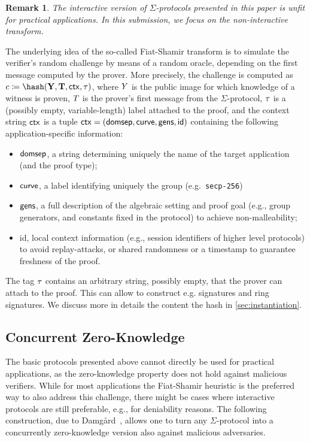 \documentclass[runningheads,11pt]{article}
\newtheorem{remark}{Remark}
\begin{document}
\begin{remark}
The interactive version of $\Sigma$-protocols presented in this paper is unfit for practical applications.
 In this submission, we focus on the non-interactive transform.
\end{remark}


The underlying idea of the so-called Fiat-Shamir transform is to simulate the verifier's random challenge by means of a random oracle, depending on the first message computed by the prover.
More precisely, the challenge is computed as
$c\defeq\hash(\vec \statement,\vec \commitment, \ctx, \stag)$,
where $Y$ is the public image for which knowledge of a witness is proven, $T$ is the prover's first message from the $\Sigma$-protocol, $\tau$ is a (possibly empty, variable-length) label attached to the proof, and
the context string $\mathsf{ctx}$ is a tuple $\mathsf{ctx} = (\textsf{domsep}, \textsf{curve}, \textsf{gens}, \textsf{id})$ containing the following application-specific information:
\begin{itemize}
  \item $\textsf{domsep}$, a string determining uniquely the name of the target application (and the proof type);
  \item $\textsf{curve}$, a label identifying uniquely the group (e.g.\ \verb|secp-256|)
  \item $\textsf{gens}$,
    a full description of the algebraic setting and proof goal (e.g., group generators, and constants fixed in the protocol) to achieve non-malleability;
  \item \textsf{id},
    local context information (e.g., session identifiers of higher level protocols) to avoid replay-attacks, or shared randomness or a timestamp to guarantee freshness of the proof.
\end{itemize}
The tag $\tau$ contains an arbitrary string, possibly empty, that the prover can attach to the proof. This can allow to construct e.g. signatures and ring signatures.
We discuss more in details the content the hash in \cref{sec:instantiation}.




\subsection{Concurrent Zero-Knowledge}\label{sec:concurrent}
The basic protocols presented above cannot directly be used for practical applications, as the zero-knowledge property does not hold against malicious verifiers.
While for most applications the Fiat-Shamir heuristic is the preferred way to also address this challenge, there might be cases where interactive protocols are still preferable, e.g., for deniability reasons.
The following construction, due to Damg\r{a}rd~\cite{EC:Damgard00}, allows one to turn any $\Sigma$-protocol into a concurrently zero-knowledge version also against malicious adversaries.
\end{document}
